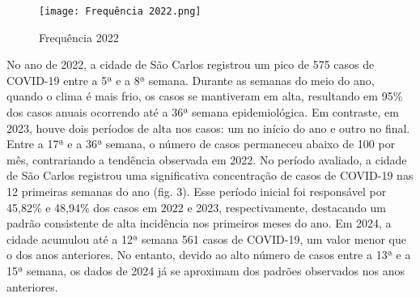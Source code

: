 \documentclass[a4paper,12pt]{report}
\begin{document}
\begin{figure}[H]
    \centering
    \texttt{[image: Frequência 2022.png]}
    \caption{Frequência 2022}
    \label{fig:enter-label}
\end{figure}

No ano de 2022, a cidade de São Carlos registrou um pico de 575 casos de COVID-19 entre a 5ª e a 8ª semana. Durante as semanas do meio do ano, quando o clima é mais frio, os casos se mantiveram em alta, resultando em 95\% dos casos anuais ocorrendo até a 36ª semana epidemiológica. Em contraste, em 2023, houve dois períodos de alta nos casos: um no início do ano e outro no final. Entre a 17ª e a 36ª semana, o número de casos permaneceu abaixo de 100 por mês, contrariando a tendência observada em 2022. 
No período avaliado, a cidade de São Carlos registrou uma significativa concentração de casos de COVID-19 nas 12 primeiras semanas do ano (fig. 3). Esse período inicial foi responsável por 45,82\% e 48,94\% dos casos em 2022 e 2023, respectivamente, destacando um padrão consistente de alta incidência nos primeiros meses do ano. Em 2024, a cidade acumulou até a 12ª semana 561 casos de COVID-19, um valor menor que o dos anos anteriores. No entanto, devido ao alto número de casos entre a 13ª e a 15ª semana, os dados de 2024 já se aproximam dos padrões observados nos anos anteriores.
 
\end{document}
